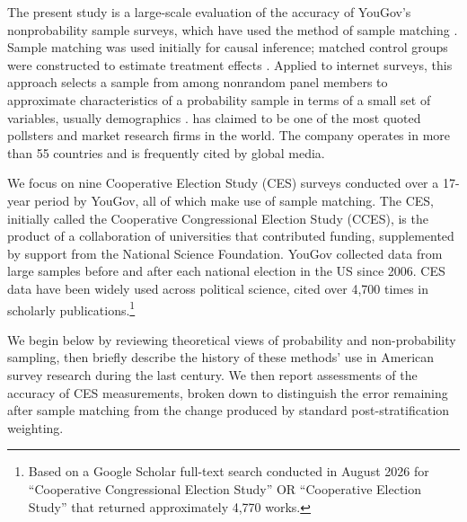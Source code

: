 \documentclass[12pt]{article}
\begin{document}
The present study is a large-scale evaluation of the
accuracy of YouGov’s nonprobability sample surveys, which have used the method
of sample matching \parencite{rivers_sampling_2007}. Sample matching was used initially for causal
inference; matched control groups were constructed
to estimate treatment effects \parencite{stuart_matching_2010}. Applied to internet surveys, this
approach selects a sample from among nonrandom panel members to
approximate characteristics of a probability sample in terms of a small set of
variables, usually demographics \parencite{rivers_sample_2006}. \textcite{noauthor_yougov_nodate} has claimed to be
one of the most quoted pollsters and market research firms in the world. The company
operates in more than 55 countries and is frequently cited by global media.

We focus on nine Cooperative Election Study (CES) surveys conducted over a 17-year period by YouGov, all of which make use of sample matching. The CES, initially called the Cooperative Congressional Election Study (CCES), is the product of a collaboration of universities that contributed funding, supplemented by support from the National Science Foundation. YouGov collected data from large samples before and after each national election in the US since 2006. CES data have been widely used across political science, cited over 4,700 times in scholarly publications.\footnote{Based on a Google Scholar full-text search conducted in August 2026 for ``Cooperative Congressional Election Study'' OR ``Cooperative Election Study'' that returned approximately 4,770 works.}

We begin below by reviewing theoretical views of probability and non-probability sampling, then briefly describe the history of these methods’ use in American survey research during the last century. We then report assessments of the accuracy of CES measurements, broken down to distinguish the error remaining after sample matching from the change produced by standard post-stratification weighting.
\end{document}
